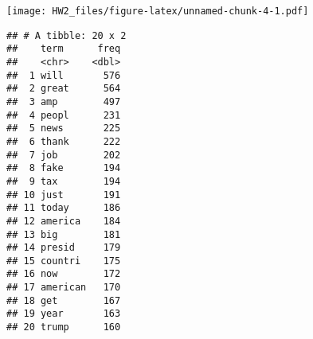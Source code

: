 \documentclass[]{article}
\newenvironment{Shaded}{\begin{snugshade}}{\end{snugshade}}
\newcommand{\KeywordTok}[1]{\textcolor[rgb]{0.13,0.29,0.53}{\textbf{#1}}}
\newcommand{\DataTypeTok}[1]{\textcolor[rgb]{0.13,0.29,0.53}{#1}}
\newcommand{\DecValTok}[1]{\textcolor[rgb]{0.00,0.00,0.81}{#1}}
\newcommand{\StringTok}[1]{\textcolor[rgb]{0.31,0.60,0.02}{#1}}
\newcommand{\OperatorTok}[1]{\textcolor[rgb]{0.81,0.36,0.00}{\textbf{#1}}}
\newcommand{\NormalTok}[1]{#1}
\begin{document}
\begin{Shaded}
\end{Shaded}

\texttt{[image: HW2\_files/figure-latex/unnamed-chunk-4-1.pdf]}

\begin{Shaded}
\end{Shaded}

\begin{verbatim}
## # A tibble: 20 x 2
##    term      freq
##    <chr>    <dbl>
##  1 will       576
##  2 great      564
##  3 amp        497
##  4 peopl      231
##  5 news       225
##  6 thank      222
##  7 job        202
##  8 fake       194
##  9 tax        194
## 10 just       191
## 11 today      186
## 12 america    184
## 13 big        181
## 14 presid     179
## 15 countri    175
## 16 now        172
## 17 american   170
## 18 get        167
## 19 year       163
## 20 trump      160
\end{verbatim}
\end{document}
